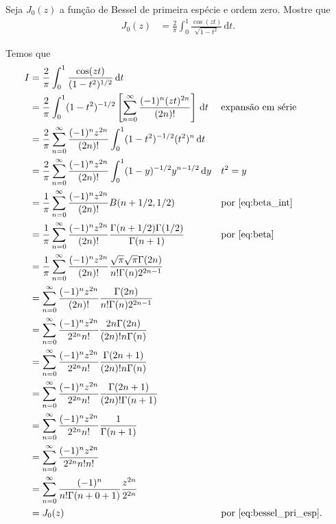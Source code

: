 \documentclass[a4paper,12pt, leqno, answers]{exam}
\begin{document}
\begin{questions}
     Seja $J_0(z)$ a fun\c{c}\~{a}o de Bessel de primeira esp\'{e}cie e ordem zero. Mostre que
    \begin{align*}
        J_0(z) &= \frac{2}{\pi} \int_0^1 \frac{\cos(zt)}{\sqrt{1 - t^2}} \,\mathrm{d}t.
    \end{align*}
    \begin{solution}
        Temos que
        \begin{align*}
            I &= \frac{2}{\pi} \int_0^1 \frac{\cos(zt)}{(1 - t^2)^{1/2}} \,\mathrm{d}t \\
            &= \frac{2}{\pi} \int_0^1 (1 - t^2)^{-1/2} \left[ \sum_{n = 0}^\infty \frac{(-1)^n (zt)^{2n}}{(2n)!} \right] \,\mathrm{d}t && \text{expans\~{a}o em s\'{e}rie} \\
            &= \frac{2}{\pi} \sum_{n = 0}^\infty \frac{(-1)^n z^{2n}}{(2n)!} \int_0^1 (1 - t^2)^{-1/2} (t^2)^n \,\mathrm{d}t \\
            &= \frac{2}{\pi} \sum_{n = 0}^\infty \frac{(-1)^n z^{2n}}{(2n)!} \int_0^1 (1 - y)^{-1/2} y^{n - 1/2} \,\mathrm{d}y && t^2 = y \\
            &= \frac{1}{\pi} \sum_{n = 0}^\infty \frac{(-1)^n z^{2n}}{(2n)!} B(n + 1/2, 1/2) && \text{por \eqref{eq:beta_int}} \\
            &= \frac{1}{\pi} \sum_{n = 0}^\infty \frac{(-1)^n z^{2n}}{(2n)!} \frac{\Gamma(n + 1/2) \Gamma(1/2)}{\Gamma(n + 1)} && \text{por \eqref{eq:beta}} \\
            &= \frac{1}{\pi} \sum_{n = 0}^\infty \frac{(-1)^n z^{2n}}{(2n)!} \frac{\sqrt{\pi} \sqrt{\pi} \Gamma(2n)}{n! \Gamma(n) 2^{2n - 1}} \\
            &= \sum_{n = 0}^\infty \frac{(-1)^n z^{2n}}{(2n)!} \frac{\Gamma(2n)}{n! \Gamma(n) 2^{2n - 1}} \\
            &= \sum_{n = 0}^\infty \frac{(-1)^n z^{2n}}{2^{2n} n!} \frac{2n \Gamma(2n)}{(2n)! n \Gamma(n)} \\
            &= \sum_{n = 0}^\infty \frac{(-1)^n z^{2n}}{2^{2n} n!} \frac{\Gamma(2n + 1)}{(2n)! n \Gamma(n)} \\
            &= \sum_{n = 0}^\infty \frac{(-1)^n z^{2n}}{2^{2n} n!} \frac{\Gamma(2n + 1)}{(2n)! \Gamma(n + 1)} \\
            &= \sum_{n = 0}^\infty \frac{(-1)^n z^{2n}}{2^{2n} n!} \frac{1}{\Gamma(n + 1)} \\
            &= \sum_{n = 0}^\infty \frac{(-1)^n z^{2n}}{2^{2n} n! n!} \\
            &= \sum_{n = 0}^\infty \frac{(-1)^n}{n! \Gamma(n + 0 + 1)} \frac{z^{2n}}{2^{2n}} \\
            &= J_0(z) && \text{por \eqref{eq:bessel_pri_esp}}.
        \end{align*}
    \end{solution}


\end{questions}
\end{document}
